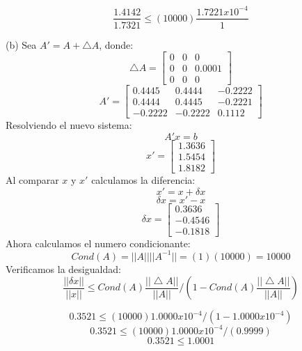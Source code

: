 $$\frac{1.4142}{1.7321} \leq (10000)\frac{1.7221 x 10^{-4}}{1}$$


(b) Sea $A'=A+\bigtriangleup A$, donde:
$$\bigtriangleup A=\begin{bmatrix}
    0 & 0 & 0\\
    0& 0 & 0.0001\\
    0&0&0
\end{bmatrix}
$$
$$A'=\begin{bmatrix}
     0.4445&0.4444&-0.2222\\
    0.4444&0.4445&-0.2221\\
    -0.2222&-0.2222&0.1112
\end{bmatrix}
$$
Resolviendo el nuevo sistema:
$$A'x=b$$
$$x'=\begin{bmatrix}
    1.3636\\
    1.5454\\
    1.8182
\end{bmatrix}
$$
Al comparar $x$ y $x'$ calculamos la diferencia:
$$x'=  x+\delta x $$
$$\delta x = x'-x$$
$$\delta x=\begin{bmatrix}
    0.3636\\
  -0.4546\\
   -0.1818
\end{bmatrix}$$
Ahora calculamos el numero condicionante:
$$Cond(A)=||A||||A^{-1}||= (1)(10000)=10000$$
Verificamos la desigualdad:
$$\frac{||\delta x||}{||x||} \leq Cond(A)\frac{||\bigtriangleup A||}{||A||}/(1-Cond(A)\frac{||\bigtriangleup A||}{||A||})$$

$$0.3521 \leq (10000)1.0000 x 10^{-4}/(1-1.0000 x 10^{-4})$$
$$0.3521 \leq (10000)1.0000 x 10^{-4}/(0.9999)$$
$$0.3521 \leq 1.0001$$